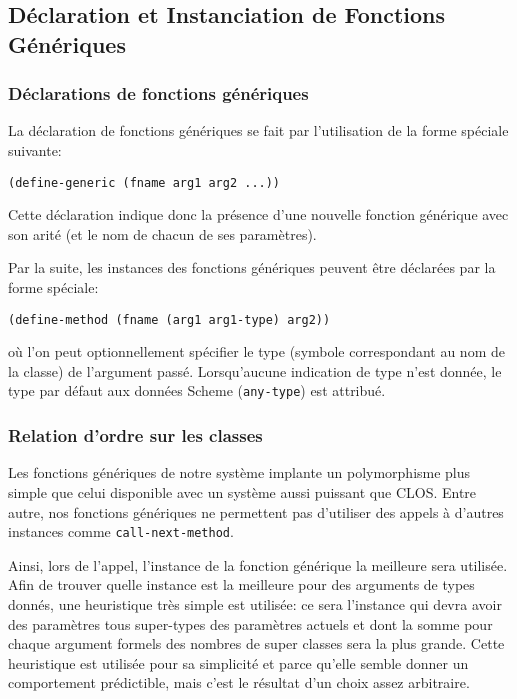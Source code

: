     \subsection{Déclaration et Instanciation de Fonctions Génériques}

      \subsubsection{Déclarations de fonctions génériques}
        La déclaration de fonctions génériques se fait par l'utilisation
        de la forme spéciale suivante:

      \begin{lstlisting}
(define-generic (fname arg1 arg2 ...))
      \end{lstlisting}

        Cette déclaration indique donc la présence d'une nouvelle
        fonction générique avec son arité (et le nom de chacun de ses
        paramètres).

        Par la suite, les instances des fonctions génériques peuvent
        être déclarées par la forme spéciale:

      \begin{lstlisting}
(define-method (fname (arg1 arg1-type) arg2))
      \end{lstlisting}

        où l'on peut optionnellement spécifier le type (symbole
        correspondant au nom de la classe) de l'argument
        passé. Lorsqu'aucune indication de type n'est donnée, le type
        par défaut aux données Scheme (\texttt{any-type}) est
        attribué.

      \subsubsection{Relation d'ordre sur les classes}
        \label{class-order-rel}
        Les fonctions génériques de notre système implante un
        polymorphisme plus simple que celui disponible avec un système
        aussi puissant que CLOS. Entre autre, nos fonctions génériques
        ne permettent pas d'utiliser des appels à d'autres instances
        comme \texttt{call-next-method}.

        Ainsi, lors de l'appel, l'instance de la fonction générique la
        \og meilleure \fg sera utilisée. Afin de trouver quelle
        instance est la meilleure pour des arguments de types donnés,
        une heuristique très simple est utilisée: ce sera l'instance
        qui devra avoir des paramètres tous super-types des paramètres
        actuels et dont la somme pour chaque argument formels des
        nombres de super classes sera la plus grande. Cette
        heuristique est utilisée pour sa simplicité et parce qu'elle
        semble donner un comportement prédictible, mais c'est le
        résultat d'un choix assez arbitraire.

